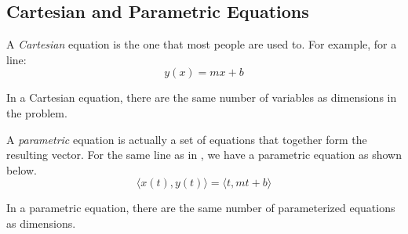 \subsection{Cartesian and Parametric Equations}\label{subsec:Cartesian_Parametric}
\begin{definition}[Cartesian]\label{def:Cartesian}
  A \emph{Cartesian} equation is the one that most people are used to.
  For example, for a line:
  \begin{equation}\label{eq:Generic_Cartesian_Line}
    y(x) = mx + b
  \end{equation}

  In a Cartesian equation, there are the same number of variables as dimensions in the problem.
\end{definition}

\begin{definition}[Parametric]\label{def:Parametric}
  A \emph{parametric} equation is actually a set of equations that together form the resulting vector.
  For the same line as in , we have a parametric equation as shown below.
  \begin{equation}\label{eq:Generic_Parametric_Line}
    \langle x(t), y(t) \rangle = \langle t, mt + b \rangle
  \end{equation}

  In a parametric equation, there are the same number of parameterized equations as dimensions.
\end{definition}


